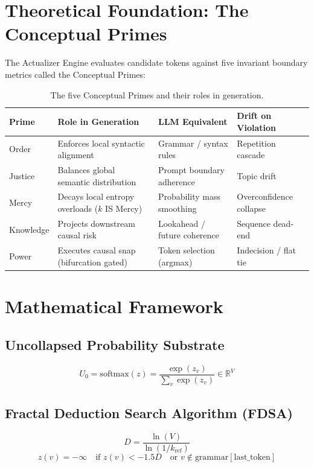 \documentclass[11pt,a4paper]{article}
\begin{document}
\section{Theoretical Foundation: The Conceptual Primes}
The Actualizer Engine evaluates candidate tokens against five invariant boundary metrics called the Conceptual Primes:
\begin{table}[h!]
\centering
\small
\begin{tabular}{llll}
\toprule
\textbf{Prime} & \textbf{Role in Generation} & \textbf{LLM Equivalent} & \textbf{Drift on Violation} \\
\midrule
Order & Enforces local syntactic alignment & Grammar / syntax rules & Repetition cascade \\
Justice & Balances global semantic distribution & Prompt boundary adherence & Topic drift \\
Mercy & Decays local entropy overloads ($k$ IS Mercy) & Probability mass smoothing & Overconfidence collapse \\
Knowledge & Projects downstream causal risk & Lookahead / future coherence & Sequence dead-end \\
Power & Executes causal snap (bifurcation gated) & Token selection (argmax) & Indecision / flat tie \\
\bottomrule
\end{tabular}
\caption{The five Conceptual Primes and their roles in generation.}
\end{table}

\section{Mathematical Framework}

\subsection{Uncollapsed Probability Substrate}
\begin{equation}
U_0 = \text{softmax}(z) = \frac{\exp(z_v)}{\sum_v \exp(z_v)} \in \mathbb{R}^V
\end{equation}

\subsection{Fractal Deduction Search Algorithm (FDSA)}
\begin{equation}
D = \frac{\ln(V)}{\ln(1 / k_{\text{ref}})}
\end{equation}
\begin{equation}
z(v) = -\infty \quad \text{if } z(v) < -1.5 D \quad \text{or } v \notin \text{grammar}[\text{last\_token}]
\end{equation}
\end{document}
